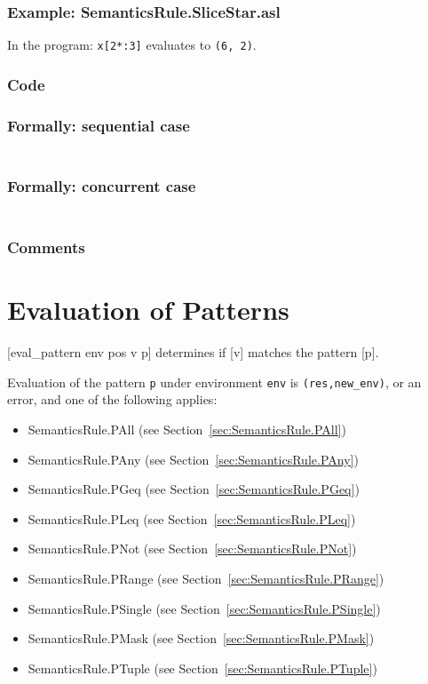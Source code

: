 \documentclass{book}
\begin{document}
  \subsection{Example: SemanticsRule.SliceStar.asl}
  In the program:
  \texttt{x[2*:3]} evaluates to \texttt{(6, 2)}.

  \subsection{Code}

  \subsection{Formally: sequential case}
  \begin{align}
  \end{align} 

  \subsection{Formally: concurrent case}
  \begin{align}
  \end{align} 

  \subsection{Comments}

\chapter{Evaluation of Patterns \label{chap:eval_pattern}}
[eval\_pattern env pos v p] determines if [v] matches the pattern [p].

Evaluation of the pattern \texttt{p} under environment \texttt{env} is
\texttt{(res,new\_env)}, or an error, and one of the following applies:
\begin{itemize}
\item SemanticsRule.PAll (see Section~\ref{sec:SemanticsRule.PAll})
\item SemanticsRule.PAny (see Section~\ref{sec:SemanticsRule.PAny})
\item SemanticsRule.PGeq (see Section~\ref{sec:SemanticsRule.PGeq})
\item SemanticsRule.PLeq (see Section~\ref{sec:SemanticsRule.PLeq})
\item SemanticsRule.PNot (see Section~\ref{sec:SemanticsRule.PNot})
\item SemanticsRule.PRange (see Section~\ref{sec:SemanticsRule.PRange})
\item SemanticsRule.PSingle (see Section~\ref{sec:SemanticsRule.PSingle})
\item SemanticsRule.PMask (see Section~\ref{sec:SemanticsRule.PMask})
\item SemanticsRule.PTuple (see Section~\ref{sec:SemanticsRule.PTuple})
\end{itemize}
\end{document}
